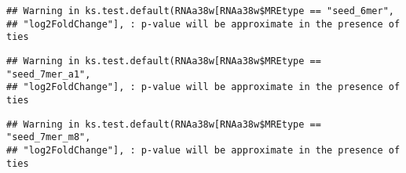 \documentclass[
]{article}
\newenvironment{Shaded}{\begin{snugshade}}{\end{snugshade}}
\newcommand{\FunctionTok}[1]{\textcolor[rgb]{0.13,0.29,0.53}{\textbf{#1}}}
\newcommand{\NormalTok}[1]{#1}
\newcommand{\OtherTok}[1]{\textcolor[rgb]{0.56,0.35,0.01}{#1}}
\newcommand{\SpecialCharTok}[1]{\textcolor[rgb]{0.81,0.36,0.00}{\textbf{#1}}}
\newcommand{\StringTok}[1]{\textcolor[rgb]{0.31,0.60,0.02}{#1}}
\begin{document}
\begin{verbatim}
## Warning in ks.test.default(RNAa38w[RNAa38w$MREtype == "seed_6mer",
## "log2FoldChange"], : p-value will be approximate in the presence of ties
\end{verbatim}

\begin{Shaded}
\end{Shaded}

\begin{verbatim}
## Warning in ks.test.default(RNAa38w[RNAa38w$MREtype == "seed_7mer_a1",
## "log2FoldChange"], : p-value will be approximate in the presence of ties
\end{verbatim}

\begin{Shaded}
\end{Shaded}

\begin{verbatim}
## Warning in ks.test.default(RNAa38w[RNAa38w$MREtype == "seed_7mer_m8",
## "log2FoldChange"], : p-value will be approximate in the presence of ties
\end{verbatim}

\begin{Shaded}
\end{Shaded}
\end{document}
